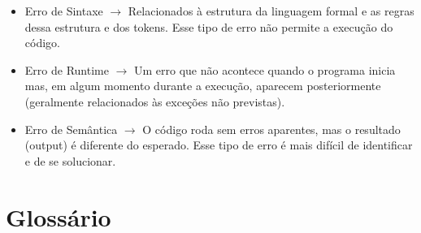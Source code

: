 \documentclass[a4paper,11pt]{book}
\begin{document}
\begin{itemize}
	\item Erro de Sintaxe $ \rightarrow $ Relacionados à estrutura da linguagem formal e as regras dessa estrutura e dos tokens. Esse tipo de erro não permite a execução do código.
	\item Erro de Runtime $ \rightarrow $ Um erro que não acontece quando o programa inicia mas, em algum momento durante a execução, aparecem posteriormente (geralmente relacionados às exceções não previstas).
	\item Erro de Semântica $ \rightarrow $ O código roda sem erros aparentes, mas o resultado (output) é diferente do esperado. Esse tipo de erro é mais difícil de identificar e de se solucionar. 
\end{itemize}

\section{Glossário}
\end{document}
